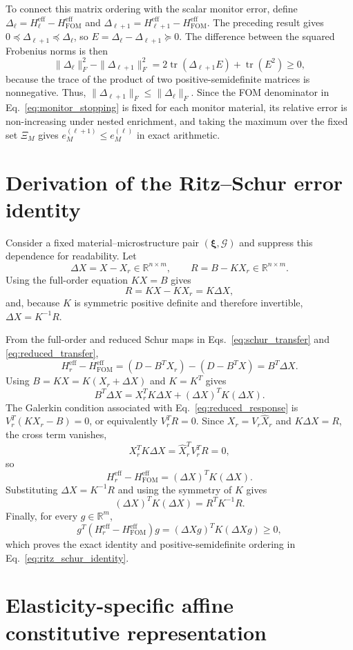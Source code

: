 \documentclass[pdflatex,sn-basic,Numbered]{sn-jnl}
\newcommand{\R}{\mathbb{R}}
\newcommand{\G}{\mathcal{G}}
\newcommand{\Hr}{H^{\mathrm{eff}}_r}
\newcommand{\Hfom}{H^{\mathrm{eff}}_{\mathrm{FOM}}}
\begin{document}
To connect this matrix ordering with the scalar monitor error, define
\(\Delta_\ell=H_\ell^{\mathrm{eff}}-\Hfom\) and
\(\Delta_{\ell+1}=H_{\ell+1}^{\mathrm{eff}}-\Hfom\). The preceding result
gives
\(0\preceq\Delta_{\ell+1}\preceq\Delta_\ell\), so
\(E=\Delta_\ell-\Delta_{\ell+1}\succeq0\). The difference between the
squared Frobenius norms is then
\[
\|\Delta_\ell\|_F^2-
\|\Delta_{\ell+1}\|_F^2
=
2\operatorname{tr}(\Delta_{\ell+1}E)
+
\operatorname{tr}(E^2)
\geq0,
\]
because the trace of the product of two positive-semidefinite matrices is
nonnegative. Thus,
\(\|\Delta_{\ell+1}\|_F\leq\|\Delta_\ell\|_F\). Since the FOM denominator
in Eq.~\eqref{eq:monitor_stopping} is fixed for each monitor material, its
relative error is non-increasing under nested enrichment, and taking the
maximum over the fixed set \(\Xi_M\) gives
\(e_M^{(\ell+1)}\leq e_M^{(\ell)}\) in exact arithmetic.

\section{Derivation of the Ritz--Schur error identity}
\label{app:ritz_schur_identity_derivation}

Consider a fixed material--microstructure pair \((\boldsymbol\xi,\G)\) and
suppress this dependence for readability. Let
\[
\Delta X=X-X_r\in\R^{n\times m},
\qquad
R=B-KX_r\in\R^{n\times m}.
\]
Using the full-order equation \(KX=B\) gives
\[
R
=
KX-KX_r
=
K\Delta X,
\]
and, because \(K\) is symmetric positive definite and therefore invertible,
\(\Delta X=K^{-1}R\).

From the full-order and reduced Schur maps in
Eqs.~\eqref{eq:schur_transfer} and \eqref{eq:reduced_transfer},
\[
\Hr-\Hfom
=
\left(D-B^TX_r\right)-\left(D-B^TX\right)
=
B^T\Delta X.
\]
Using \(B=KX=K(X_r+\Delta X)\) and \(K=K^T\) gives
\[
B^T\Delta X
=
X_r^TK\Delta X
+
(\Delta X)^TK(\Delta X).
\]
The Galerkin condition associated with Eq.~\eqref{eq:reduced_response} is
\(V_r^T(KX_r-B)=0\), or equivalently \(V_r^TR=0\). Since
\(X_r=V_r\widehat X_r\) and \(K\Delta X=R\), the cross term vanishes,
\[
X_r^TK\Delta X
=
\widehat X_r^TV_r^TR
=
0,
\]
so
\[
\Hr-\Hfom
=
(\Delta X)^TK(\Delta X).
\]
Substituting \(\Delta X=K^{-1}R\) and using the symmetry of \(K\) gives
\[
(\Delta X)^TK(\Delta X)
=
R^TK^{-1}R.
\]
Finally, for every \(g\in\R^m\),
\[
g^T(\Hr-\Hfom)g
=
(\Delta Xg)^TK(\Delta Xg)
\geq0,
\]
which proves the exact identity and positive-semidefinite ordering in
Eq.~\eqref{eq:ritz_schur_identity}.

\section{Elasticity-specific affine constitutive representation}
\label{app:affine}
\end{document}
